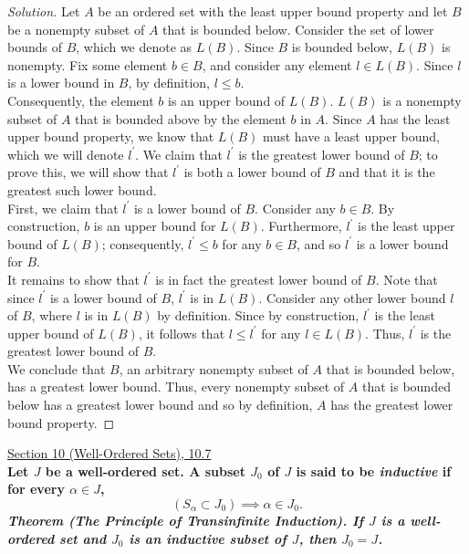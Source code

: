 \documentclass[11pt]{article}
\newenvironment{solution}
  {\renewcommand\qedsymbol{$\blacksquare$}\begin{proof}[Solution]}
  {\end{proof}}
\begin{document}
\begin{solution}
Let $A$ be an ordered set with the least upper bound property and let $B$ be a nonempty subset of $A$ that is bounded below. Consider the set of lower bounds of $B$, which we denote as $L(B)$. Since $B$ is bounded below,
$L(B)$ is nonempty. Fix some element $b \in B$, and consider any element $l \in L(B)$. Since $l$ is a lower bound in $B$, by definition, $l \leq b$. \\

Consequently, the element $b$ is an upper bound of $L(B)$. $L(B)$ is a nonempty subset of $A$ that is bounded above by the element $b$ in $A$. Since $A$ has the least upper bound property,
we know that $L(B)$ must have a least upper bound, which we will denote $l^{\prime}$. We claim that $l^{\prime}$ is the greatest lower bound of $B$; to prove this,
we will show that $l^{\prime}$ is both a lower bound of $B$ and that it is the greatest such lower bound.\\

First, we claim that $l^{\prime}$ is a lower bound of $B$. Consider any $b \in B$. By construction, $b$ is an upper bound for $L(B)$. Furthermore, $l^{\prime}$ is the least upper bound of $L(B)$;
consequently, $l^{\prime} \leq b$ for any $b \in B$, and so $l^{\prime}$ is a lower bound for $B$. \\

It remains to show that $l^{\prime}$ is in fact the greatest lower bound of $B$. Note that since $l^{\prime}$ is a lower bound of $B$, $l^{\prime}$ is in $L(B)$. 
Consider any other lower bound $l$ of $B$, where $l$ is in $L(B)$ by definition.
Since by construction, $l^{\prime}$ is the least upper bound of $L(B)$, it follows that $l \leq l^{\prime}$ for any $l \in L(B)$. Thus, $l^{\prime}$ is the greatest lower bound of $B$. \\

We conclude that $B$, an arbitrary nonempty subset of $A$ that is bounded below, has a greatest lower bound. Thus, every nonempty subset of $A$ that is bounded below has a greatest lower bound
and so by definition, $A$ has the greatest lower bound property. 
\end{solution}
\newpage

\underline{Section 10 (Well-Ordered Sets), 10.7} \\

\textbf{Let $J$ be a well-ordered set. A subset $J_0$ of $J$ is said to be \textit{inductive} if for every $\alpha \in J$,}
\[
  (S_\alpha \subset J_0) \implies \alpha \in J_0.
\]
\textbf{\textit{Theorem (The Principle of Transinfinite Induction). If $J$ is a well-ordered set and $J_0$ is an inductive subset of $J$, then $J_0 = J$.}}
\end{document}
